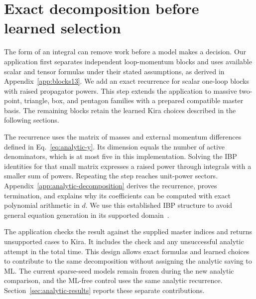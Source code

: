 \section{Exact decomposition before learned selection}
\label{sec:analytic-method}
The form of an integral can remove work before a model makes a decision. Our application first separates independent loop-momentum blocks and uses available scalar and tensor formulas under their stated assumptions, as derived in Appendix~\ref{app:blocks13}. We add an exact recurrence for scalar one-loop blocks with raised propagator powers. This step extends the application to massive two-point, triangle, box, and pentagon families with a prepared compatible master basis. The remaining blocks retain the learned Kira choices described in the following sections.

The recurrence uses the matrix of masses and external momentum differences defined in Eq.~\eqref{eq:analytic-y}. Its dimension equals the number of active denominators, which is at most five in this implementation. Solving the IBP identities for that small matrix expresses a raised power through integrals with a smaller sum of powers. Repeating the step reaches unit-power sectors. Appendix~\ref{app:analytic-decomposition} derives the recurrence, proves termination, and explains why its coefficients can be computed with exact polynomial arithmetic in $d$. We use this established IBP structure to avoid general equation generation in its supported domain~\cite{ChetyrkinTkachov,Hu2025}.

The application checks the result against the supplied master indices and returns unsupported cases to Kira. It includes the check and any unsuccessful analytic attempt in the total time. This design allows exact formulas and learned choices to contribute to the same decomposition without assigning the analytic saving to ML. The current sparse-seed models remain frozen during the new analytic comparison, and the ML-free control uses the same analytic recurrence. Section~\ref{sec:analytic-results} reports these separate contributions.
